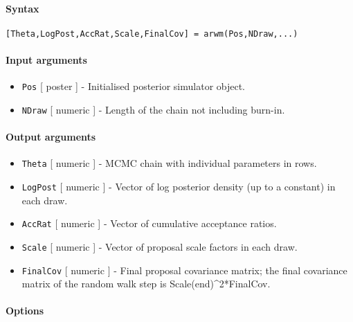 


	\paragraph{Syntax}\label{syntax}

\begin{verbatim}
[Theta,LogPost,AccRat,Scale,FinalCov] = arwm(Pos,NDraw,...)
\end{verbatim}

\paragraph{Input arguments}\label{input-arguments}

\begin{itemize}
\item
  \texttt{Pos} {[} poster {]} - Initialised posterior simulator object.
\item
  \texttt{NDraw} {[} numeric {]} - Length of the chain not including
  burn-in.
\end{itemize}

\paragraph{Output arguments}\label{output-arguments}

\begin{itemize}
\item
  \texttt{Theta} {[} numeric {]} - MCMC chain with individual parameters
  in rows.
\item
  \texttt{LogPost} {[} numeric {]} - Vector of log posterior density (up
  to a constant) in each draw.
\item
  \texttt{AccRat} {[} numeric {]} - Vector of cumulative acceptance
  ratios.
\item
  \texttt{Scale} {[} numeric {]} - Vector of proposal scale factors in
  each draw.
\item
  \texttt{FinalCov} {[} numeric {]} - Final proposal covariance matrix;
  the final covariance matrix of the random walk step is
  Scale(end)\^{}2*FinalCov.
\end{itemize}

\paragraph{Options}\label{options}

